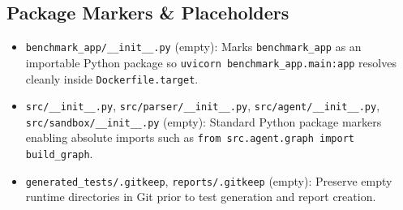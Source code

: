 \documentclass[11pt,a4paper]{article}
\begin{document}
\subsection{Package Markers \& Placeholders}
\begin{itemize}[leftmargin=1.5em]
    \item \texttt{benchmark\_app/\_\_init\_\_.py} (empty): Marks \texttt{benchmark\_app} as an importable Python package so \texttt{uvicorn benchmark\_app.main:app} resolves cleanly inside \texttt{Dockerfile.target}.
    \item \texttt{src/\_\_init\_\_.py}, \texttt{src/parser/\_\_init\_\_.py}, \texttt{src/agent/\_\_init\_\_.py}, \texttt{src/sandbox/\_\_init\_\_.py} (empty): Standard Python package markers enabling absolute imports such as \texttt{from src.agent.graph import build\_graph}.
    \item \texttt{generated\_tests/.gitkeep}, \texttt{reports/.gitkeep} (empty): Preserve empty runtime directories in Git prior to test generation and report creation.
\end{itemize}

\end{document}
